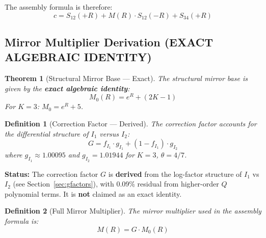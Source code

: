 \documentclass[11pt]{article}
\newtheorem{theorem}{Theorem}
\newtheorem{definition}{Definition}
\begin{document}
The assembly formula is therefore:
\begin{equation}
\boxed{c = S_{12}(+R) + M(R) \cdot S_{12}(-R) + S_{34}(+R)}
\end{equation}

\subsection{Mirror Multiplier Derivation (EXACT ALGEBRAIC IDENTITY)}

\begin{theorem}[Structural Mirror Base --- Exact]
\label{thm:mirror-base}
The structural mirror base is given by the \textbf{exact algebraic identity}:
\begin{equation}
\boxed{M_0(R) = e^R + (2K-1)}
\end{equation}
For $K=3$: $M_0 = e^R + 5$.
\end{theorem}

\begin{definition}[Correction Factor --- Derived]
\label{def:correction-factor}
The correction factor accounts for the differential structure of $I_1$ versus $I_2$:
\begin{equation}
G = f_{I_1} \cdot g_{I_1} + (1-f_{I_1}) \cdot g_{I_2}
\end{equation}
where $g_{I_1} \approx 1.00095$ and $g_{I_2} = 1.01944$ for $K=3$, $\theta=4/7$.
\end{definition}

\textbf{Status:} The correction factor $G$ is \textbf{derived} from the log-factor structure of $I_1$ vs $I_2$ (see Section~\ref{sec:gfactors}), with 0.09\% residual from higher-order $Q$ polynomial terms. It is \textbf{not} claimed as an exact identity.

\begin{definition}[Full Mirror Multiplier]
The mirror multiplier used in the assembly formula is:
\begin{equation}
\boxed{M(R) = G \cdot M_0(R)}
\end{equation}
\end{definition}
\end{document}

